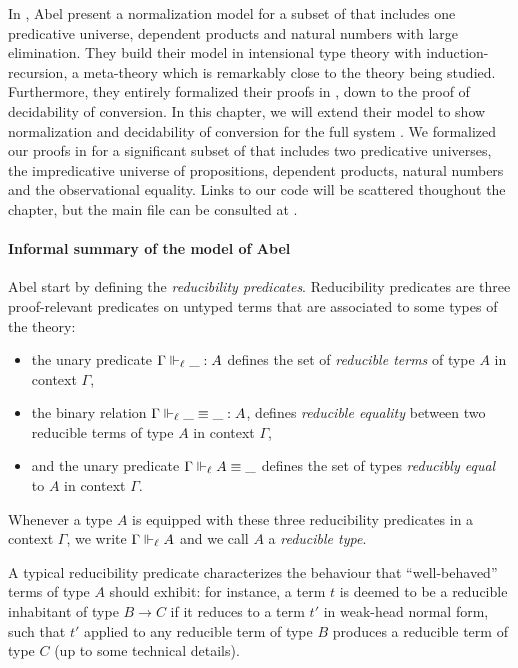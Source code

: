 In , Abel \etal present a normalization model for a 
subset of \MLTT that includes one predicative universe, dependent products and 
natural numbers with large elimination.
% 
They build their model in intensional type theory with induction-recursion, 
a meta-theory which is remarkably close to the theory being studied.
% 
Furthermore, they entirely formalized their proofs in \Agda, down to the proof
of decidability of conversion.
% 
In this chapter, we will extend their model to show normalization and decidability
of conversion for the full system \SetoidCC.
% 
We formalized our proofs in \Agda for a significant subset of \SetoidCC that
includes two predicative universes, the impredicative universe of propositions, 
dependent products, natural numbers and the observational equality. 
% 
Links to our code will be scattered thoughout the chapter, but 
the main file can be consulted at .

\paragraph*{Informal summary of the model of Abel \etal}
% 
Abel \etal start by defining the \emph{reducibility predicates}. 
Reducibility predicates are three proof-relevant predicates on untyped 
terms that are associated to some types of the theory:
% 
\begin{itemize}
\item the unary predicate \( {\Gamma \Vdash_{\ell} \_ : A} \) 
  defines the set of \emph{reducible terms} of type \( A \) in context \( \Gamma \),
\item the binary relation \( {\Gamma \Vdash_{\ell} \_ \equiv \_ : A} \), 
  defines \emph{reducible equality} between two reducible terms of type \( A \) in context \( \Gamma \),
\item and the unary predicate \( {\Gamma \Vdash_{\ell} A \equiv \_} \) 
  defines the set of types \emph{reducibly equal} to \( A \) in context \( \Gamma \).
\end{itemize}
% 
Whenever a type \( A \) is equipped with these three reducibility predicates in a
context \( \Gamma \), we write \( \Gamma \Vdash_{\ell} A \) and we call 
\( A \) a \emph{reducible type}.

A typical reducibility predicate characterizes the behaviour that ``well-behaved''
terms of type \( A \) should exhibit: for instance, a term \( t \) is deemed
to be a reducible inhabitant of type \( B \to C \) if it reduces to a term 
\( {t'} \) in weak-head normal form, such that \( {t'} \) applied to
any reducible term of type \( B \) produces a reducible term of type \( C \)
(up to some technical details).

